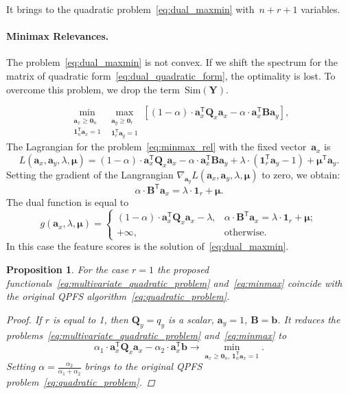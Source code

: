 \documentclass[12pt,twoside]{article}
\newtheorem{proposition}{Proposition}
\theoremstyle{definition}
\newcommand{\ba}{\mathbf{a}}
\newcommand{\bb}{\mathbf{b}}
\newcommand{\bY}{\mathbf{Y}}
\newcommand{\bB}{\mathbf{B}}
\newcommand{\bQ}{\mathbf{Q}}
\newcommand{\T}{\mathsf{T}}
\newcommand{\bmu}{\boldsymbol{\mu}}
\newcommand{\bOne}{\boldsymbol{1}}
\newcommand{\bZero}{\boldsymbol{0}}
\begin{document}
It brings to the quadratic problem~\eqref{eq:dual_maxmin} with~$n + r + 1$ variables.

\paragraph{Minimax Relevances.}

The problem~\eqref{eq:dual_maxmin} is not convex. If we shift the spectrum for the matrix of quadratic form~\eqref{eq:dual_quadratic_form}, the optimality is lost. To overcome this problem, we drop the term~$\text{Sim}(\bY)$.

\begin{equation}
\min_{\substack{\ba_x \geq \bZero_n \\ \bOne_n^{\T}\ba_x=1}} 	\max_{\substack{\ba_y \geq \bZero_r \\ \bOne_r^{\T}\ba_y=1}} \left[ (1 - \alpha) \cdot \ba_x^{\T} \bQ_x \ba_x - \alpha \cdot \ba_x^{\T} \bB \ba_y \right],
\label{eq:minmax_rel}
\end{equation}
The Lagrangian for the problem~\eqref{eq:minmax_rel} with the fixed vector~$\ba_x$ is
\[
L(\ba_x, \ba_y, \lambda, \bmu) = (1 - \alpha) \cdot \ba_x^{\T} \bQ_x \ba_x - \alpha \cdot \ba_x^{\T} \bB \ba_y + \lambda \cdot  (\bOne_r^{\T} \ba_y - 1) + \bmu^{\T} \ba_y.
\]
Setting the gradient of the Langrangian $\nabla_{\ba_y} L(\ba_x, \ba_y, \lambda, \bmu)$ to zero, we obtain:
\begin{equation*}
\alpha \cdot \bB^{\T} \ba_x = \lambda \cdot \bOne_r + \bmu.
\end{equation*}
The dual function is equal to
\begin{equation}
g(\ba_x, \lambda, \bmu) =
\begin{cases}
(1 - \alpha) \cdot \ba_x^{\T} \bQ_x \ba_x - \lambda, & \alpha \cdot \bB^{\T} \ba_x = \lambda \cdot \bOne_r + \bmu;  \\
+ \infty, & \text{otherwise}.
\end{cases}
\end{equation}
In this case the feature scores is the solution of~\eqref{eq:dual_maxmin}.

\begin{proposition}
	For the case $r=1$ the proposed functionals~\eqref{eq:multivariate_quadratic_problem} and~\eqref{eq:minmax} coincide with the original QPFS algorithm~\eqref{eq:quadratic_problem}.

	\begin{proof}
		If $r$ is equal to 1, then $\bQ_y = q_y$ is a scalar, $\ba_y = 1$, $\bB = \bb$. It reduces the problems~\eqref{eq:multivariate_quadratic_problem} and~\eqref{eq:minmax} to
		\[
		\alpha_1 \cdot \ba_x^{\T} \bQ_x \ba_x - \alpha_2 \cdot \ba_x^{\T} \bb \rightarrow \min_{\ba_x \geq \bZero_n, \, \bOne_n^{\T}\ba_x=1} .
		\]
		Setting $\alpha = \frac{\alpha_2}{\alpha_1 + \alpha_2}$ brings to the original QPFS problem~\eqref{eq:quadratic_problem}.
	\end{proof}
\end{proposition}
\end{document}
